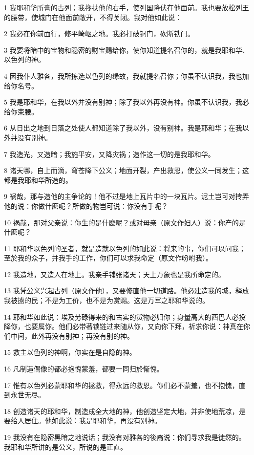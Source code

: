 \par 1 我耶和华所膏的古列；我搀扶他的右手，使列国降伏在他面前。我也要放松列王的腰带，使城门在他面前敞开，不得关闭。我对他如此说：
\par 2 我必在你前面行，修平崎岖之地。我必打破铜门，砍断铁闩。
\par 3 我要将暗中的宝物和隐密的财宝赐给你，使你知道提名召你的，就是我耶和华、以色列的神。
\par 4 因我仆人雅各，我所拣选以色列的缘故，我就提名召你；你虽不认识我，我也加给你名号。
\par 5 我是耶和华，在我以外并没有别神；除了我以外再没有神。你虽不认识我，我必给你束腰。
\par 6 从日出之地到日落之处使人都知道除了我以外，没有别神。我是耶和华；在我以外并没有别神。
\par 7 我造光，又造暗；我施平安，又降灾祸；造作这一切的是我耶和华。
\par 8 诸天哪，自上而滴，穹苍降下公义；地面开裂，产出救恩，使公义一同发生；这都是我耶和华所造的。
\par 9 祸哉，那与造他的主争论的！他不过是地上瓦片中的一块瓦片。泥土岂可对抟弄他的说：你做什麽呢？所做的物岂可说：你没有手呢？
\par 10 祸哉，那对父亲说：你生的是什麽呢？或对母亲（原文作妇人）说：你产的是什麽呢？
\par 11 耶和华以色列的圣者，就是造就以色列的如此说：将来的事，你们可以问我；至於我的众子，并我手的工作，你们可以求我命定（原文作吩咐我）。
\par 12 我造地，又造人在地上。我亲手铺张诸天；天上万象也是我所命定的。
\par 13 我凭公义兴起古列（原文作他），又要修直他一切道路。他必建造我的城，释放我被掳的民；不是为工价，也不是为赏赐。这是万军之耶和华说的。
\par 14 耶和华如此说：埃及劳碌得来的和古实的货物必归你；身量高大的西巴人必投降你，也要属你。他们必带著锁链过来随从你，又向你下拜，祈求你说：神真在你们中间，此外再没有别神；再没有别的神。
\par 15 救主以色列的神啊，你实在是自隐的神。
\par 16 凡制造偶像的都必抱愧蒙羞，都要一同归於惭愧。
\par 17 惟有以色列必蒙耶和华的拯救，得永远的救恩。你们必不蒙羞，也不抱愧，直到永世无尽。
\par 18 创造诸天的耶和华，制造成全大地的神，他创造坚定大地，并非使地荒凉，是要给人居住。他如此说：我是耶和华，再没有别神。
\par 19 我没有在隐密黑暗之地说话；我没有对雅各的後裔说：你们寻求我是徒然的。我耶和华所讲的是公义，所说的是正直。

